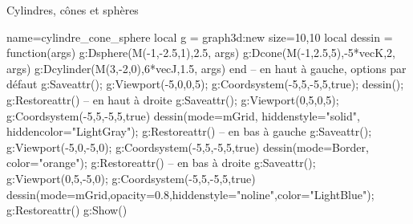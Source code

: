 \begin{demo}{Cylindres, cônes et sphères}
\begin{luadraw}{name=cylindre_cone_sphere}
local g = graph3d:new{ size={10,10} }
local dessin = function(args)
    g:Dsphere(M(-1,-2.5,1),2.5, args)
    g:Dcone(M(-1,2.5,5),-5*vecK,2, args)
    g:Dcylinder(M(3,-2,0),6*vecJ,1.5, args)
end
-- en haut à gauche, options par défaut
g:Saveattr(); g:Viewport(-5,0,0,5); g:Coordsystem(-5,5,-5,5,true); dessin(); g:Restoreattr()
-- en haut à droite
g:Saveattr(); g:Viewport(0,5,0,5); g:Coordsystem(-5,5,-5,5,true)
dessin({mode=mGrid, hiddenstyle="solid", hiddencolor="LightGray"}); g:Restoreattr()
-- en bas à gauche
g:Saveattr(); g:Viewport(-5,0,-5,0); g:Coordsystem(-5,5,-5,5,true)
dessin({mode=Border, color="orange"}); g:Restoreattr()
-- en bas à droite
g:Saveattr(); g:Viewport(0,5,-5,0); g:Coordsystem(-5,5,-5,5,true)
dessin({mode=mGrid,opacity=0.8,hiddenstyle="noline",color="LightBlue"}); g:Restoreattr()
g:Show()            
\end{luadraw}
\end{demo}
